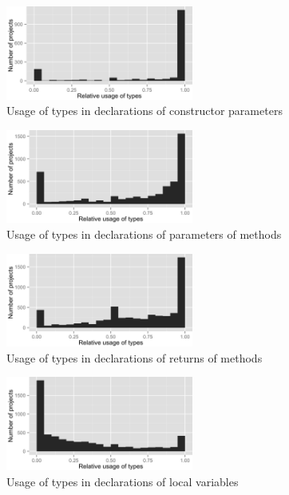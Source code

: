 \begin{figure}[h]
\centering 
\includegraphics[width=0.55\textwidth]{../aosd_2014/analysis/result/all/histograms/9_Constructor_Parameter.png} 
\caption{Usage of types in declarations of constructor parameters}
\end{figure}

\begin{figure}[h]
\centering 
\includegraphics[width=0.55\textwidth]{../aosd_2014/analysis/result/all/histograms/8_Method_Parameter.png} 
\caption{Usage of types in declarations of parameters of methods}
\end{figure}

\begin{figure}[h]
\centering 
\includegraphics[width=0.55\textwidth]{../aosd_2014/analysis/result/all/histograms/7_Method_Return.png} 
\caption{Usage of types in declarations of returns of methods}
\end{figure}

\begin{figure}[h]
\centering 
\includegraphics[width=0.55\textwidth]{../aosd_2014/analysis/result/all/histograms/6_Local_Variable.png} 
\caption{Usage of types in declarations of local variables}
\end{figure}

